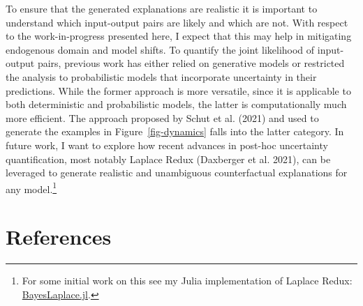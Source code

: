 \documentclass[
  sigconf]{acmart}
\begin{document}
To ensure that the generated explanations are realistic it is important
to understand which input-output pairs are likely and which are not.
With respect to the work-in-progress presented here, I expect that this
may help in mitigating endogenous domain and model shifts. To quantify
the joint likelihood of input-output pairs, previous work has either
relied on generative models or restricted the analysis to probabilistic
models that incorporate uncertainty in their predictions. While the
former approach is more versatile, since it is applicable to both
deterministic and probabilistic models, the latter is computationally
much more efficient. The approach proposed by Schut et al. (2021) and
used to generate the examples in Figure~\ref{fig-dynamics} falls into
the latter category. In future work, I want to explore how recent
advances in post-hoc uncertainty quantification, most notably Laplace
Redux (Daxberger et al. 2021), can be leveraged to generate realistic
and unambiguous counterfactual explanations for any model.\footnote{For
  some initial work on this see my Julia implementation of Laplace
  Redux:
  \href{https://www.paltmeyer.com/BayesLaplace.jl/dev/}{BayesLaplace.jl}.}

\hypertarget{references}{%
\section*{References}\label{references}}
\end{document}
